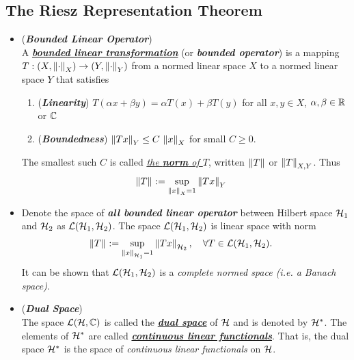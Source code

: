 \documentclass[11pt]{article}
\begin{document}
\subsection{The Riesz Representation Theorem}
\begin{itemize}
\item \begin{definition} (\emph{\textbf{Bounded Linear Operator}})\\
A \underline{\emph{\textbf{bounded linear transformation}}} (or \emph{\textbf{bounded operator}}) is a mapping $T: (X, \left\|\cdot\right\|_{X}) \rightarrow (Y, \left\|\cdot\right\|_{Y})$ from a normed linear space $X$ to a normed linear space $Y$ that satisfies 
\begin{enumerate}
\item (\emph{\textbf{Linearity}}) $T(\alpha x + \beta y) = \alpha T(x) + \beta T(y)$ for all $x, y \in X$, $\alpha, \beta \in {\mathbb R}$ or ${\mathbb C}$
\item (\emph{\textbf{Boundedness}}) $\left\|Tx\right\|_{Y} \le C\,\left\|x\right\|_{X}$ for small $C \ge 0$.
\end{enumerate} The smallest such $C$ is called \underline{\emph{the \textbf{norm} of $T$}}, written $\left\|T\right\|_{}$ or $\left\|T\right\|_{X, Y}$. Thus
\begin{align*}
\left\|T\right\|_{} &:= \sup_{\left\|x\right\|_{X} = 1 }\left\|Tx\right\|_{Y}
\end{align*}
\end{definition}

\item \begin{remark}
Denote the space of \emph{\textbf{all bounded linear operator}} between Hilbert space ${\mathcal H}_1$ and ${\mathcal H}_2$ as ${\mathcal L}({\mathcal H}_1, {\mathcal H}_2)$. The space ${\mathcal L}({\mathcal H}_1, {\mathcal H}_2)$ is linear space with norm 
\begin{align*}
\left\|T\right\|_{} &:= \sup_{\left\|x\right\|_{{\mathcal H}_1} = 1 }\left\|Tx\right\|_{{\mathcal H}_2}, \quad \forall T \in {\mathcal L}({\mathcal H}_1, {\mathcal H}_2).
\end{align*} It can be shown that ${\mathcal L}({\mathcal H}_1, {\mathcal H}_2)$ is a \emph{complete normed space (i.e. a Banach space)}.
\end{remark}

\item \begin{definition} (\emph{\textbf{Dual Space}})\\
The space ${\mathcal L}({\mathcal H}, {\mathbb C})$ is called the \underline{\emph{\textbf{dual space}}} of ${\mathcal H}$ and is denoted by ${\mathcal H}^{*}$. The elements of ${\mathcal H}^{*}$ are called \underline{\emph{\textbf{continuous linear functionals}}}. That is, the dual space ${\mathcal H}^{*}$ is the space of \emph{continuous linear functionals} on ${\mathcal H}$. 
\end{definition}


\end{itemize}
\end{document}

